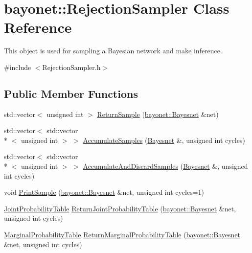 \hypertarget{classbayonet_1_1_rejection_sampler}{\section{bayonet\-:\-:Rejection\-Sampler Class Reference}
\label{classbayonet_1_1_rejection_sampler}
}


This object is used for sampling a Bayesian network and make inference.  




{\ttfamily \#include $<$Rejection\-Sampler.\-h$>$}

\subsection*{Public Member Functions}
\begin{DoxyCompactItemize}
\item 
std\-::vector$<$ unsigned int $>$ \hyperlink{classbayonet_1_1_rejection_sampler_a1f2c685367f549965dcafd9c1b77ab1e}{Return\-Sample} (\hyperlink{classbayonet_1_1_bayesnet}{bayonet\-::\-Bayesnet} \&net)
\item 
std\-::vector$<$ std\-::vector\\*
$<$ unsigned int $>$ $>$ \hyperlink{classbayonet_1_1_rejection_sampler_aa5d0525c10cba1a99fba9e4233d8ac30}{Accumulate\-Samples} (\hyperlink{classbayonet_1_1_bayesnet}{Bayesnet} \&, unsigned int cycles)
\item 
std\-::vector$<$ std\-::vector\\*
$<$ unsigned int $>$ $>$ \hyperlink{classbayonet_1_1_rejection_sampler_ab63d7fa72ea2f9e8dfcd5f873d257df4}{Accumulate\-And\-Discard\-Samples} (\hyperlink{classbayonet_1_1_bayesnet}{Bayesnet} \&, unsigned int cycles)
\item 
void \hyperlink{classbayonet_1_1_rejection_sampler_ab68ff90b1c015d6aa2d185cacb18a74d}{Print\-Sample} (\hyperlink{classbayonet_1_1_bayesnet}{bayonet\-::\-Bayesnet} \&net, unsigned int cycles=1)
\item 
\hyperlink{classbayonet_1_1_joint_probability_table}{Joint\-Probability\-Table} \hyperlink{classbayonet_1_1_rejection_sampler_a0ba74f6d5f5fd61baa968464e2e3aac5}{Return\-Joint\-Probability\-Table} (\hyperlink{classbayonet_1_1_bayesnet}{bayonet\-::\-Bayesnet} \&net, unsigned int cycles)
\item 
\hyperlink{classbayonet_1_1_marginal_probability_table}{Marginal\-Probability\-Table} \hyperlink{classbayonet_1_1_rejection_sampler_a185ff3bd9dd8e914d11c15d4bd50e385}{Return\-Marginal\-Probability\-Table} (\hyperlink{classbayonet_1_1_bayesnet}{bayonet\-::\-Bayesnet} \&net, unsigned int cycles)
\end{DoxyCompactItemize}


